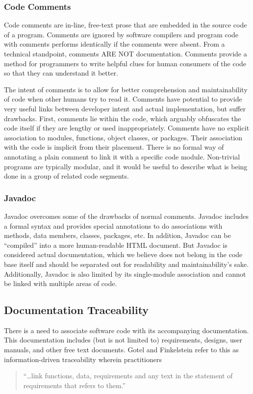 \subsubsection*{Code Comments}
Code comments are in-line, free-text prose that are embedded in the source code
of a program. Comments are ignored by software compilers and program code with
comments performs identically if the comments were absent. From a technical
standpoint, comments ARE NOT documentation. Comments provide a method for
programmers to write helpful clues for human consumers of the code so that they
can understand it better.

The intent of comments is to allow for better comprehension and maintainability
of code when other humans try to read it. Comments have potential to provide
very useful links between developer intent and actual implementation, but suffer
drawbacks. First, comments lie within the code, which arguably obfuscates the
code itself if they are lengthy or used inappropriately. Comments have no
explicit association to modules, functions, object classes, or packages. Their
association with the code is implicit from their placement. There is no formal
way of annotating a plain comment to link it with a specific code module.
Non-trivial programs are typically modular, and it would be useful to describe
what is being done in a group of related code segments.

\subsubsection*{Javadoc}
Javadoc overcomes some of the drawbacks of normal comments. Javadoc includes a
formal syntax and provides special annotations to do associations with methods,
data members, classes, packages, etc. In addition, Javadoc can be ``compiled''
into a more human-readable HTML document. But Javadoc is considered actual
documentation, which we believe does not belong in the code base itself and
should be separated out for readability and maintainability's sake.
Additionally, Javadoc is also limited by its single-module association and
cannot be linked with multiple areas of code.

\subsection{Documentation Traceability}
There is a need to associate software code with its accompanying documentation.
This documentation includes (but is not limited to) requirements, designs, user
manuals, and other free text documents. Gotel and Finkelstein refer to this as
information-driven traceability wherein practitioners
\begin{quote}
``\ldots link functions, data, requirements and any text in the statement of
requirements that refers to them.'' \cite{Gotel1994}
\end{quote}

